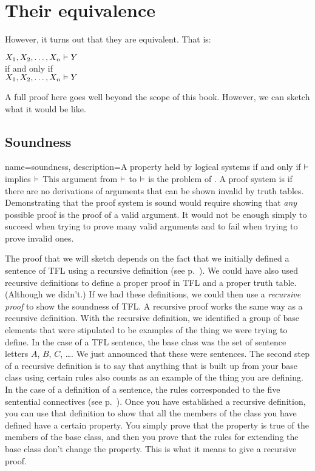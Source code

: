 \section{Their equivalence}
However, it turns out that they are equivalent.
That is:
\begin{center}
$X_1, X_2, \ldots, X_n \vdash Y$\\if and only if\\
$X_1, X_2, \ldots, X_n \vDash Y$
\end{center}
A full proof here goes well beyond the scope of this book. However, we can sketch what it would be like.

\subsection{Soundness}

{
name=soundness,
description={A property held by logical systems if and only if $\vdash $ implies $\vDash $}
}
This argument from $\vdash $ to $\vDash $ is the problem of . \label{def:soundness} A proof system is  if there are no derivations of arguments that can be shown invalid by truth tables. \label{def_Soundness} Demonstrating that the proof system is sound would require showing that \emph{any} possible proof is the proof of a valid argument. It would not be enough simply to succeed when trying to prove many valid arguments and to fail when trying to prove invalid ones.

The proof that we will sketch depends on the fact that we initially defined a sentence of TFL using a recursive definition (see p.~\pageref{TFLsentences}). We could have also used recursive definitions to define a proper proof in TFL and a proper truth table. (Although we didn't.) If we had these definitions, we could then use a \emph{recursive proof} to show the soundness of TFL. A recursive proof works the same way as a recursive definition. With the recursive definition, we identified a group of base elements that were stipulated to be examples of the thing we were trying to define. In the case of a TFL sentence, the base class was the set of sentence letters $A$, $B$, $C$, \dots. We just announced that these were sentences. The second step of a recursive definition is to say that anything that is built up from your base class using certain rules also counts as an example of the thing you are defining. In the case of a definition of a sentence, the rules corresponded to the five sentential connectives (see p.~\pageref{TFLsentences}). Once you have established a recursive definition, you can use that definition to show that all the members of the class you have defined have a certain property. You simply prove that the property is true of the members of the base class, and then you prove that the rules for extending the base class don't change the property. This is what it means to give a recursive proof.

